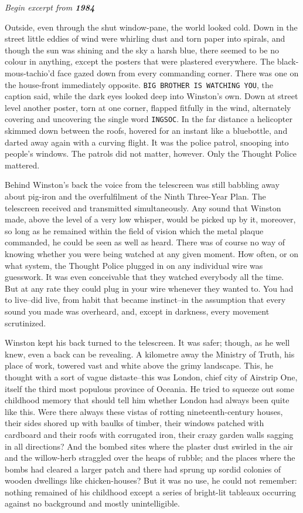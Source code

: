 \emph{Begin excerpt from \textbf{1984}}

Outside, even through the shut window-pane, the world looked cold. Down
in the street little eddies of wind were whirling dust and torn paper
into spirals, and though the sun was shining and the sky a harsh blue,
there seemed to be no colour in anything, except the posters that were
plastered everywhere. The black-mous-tachio'd face gazed down from every
commanding corner. There was one on the house-front immediately
opposite. \texttt{BIG\ BROTHER\ IS\ WATCHING\ YOU}, the caption said,
while the dark eyes looked deep into Winston's own. Down at street level
another poster, torn at one corner, flapped fitfully in the wind,
alternately covering and uncovering the single word \texttt{INGSOC}. In
the far distance a helicopter skimmed down between the roofs, hovered
for an instant like a bluebottle, and darted away again with a curving
flight. It was the police patrol, snooping into people's windows. The
patrols did not matter, however. Only the Thought Police mattered.

Behind Winston's back the voice from the telescreen was still babbling
away about pig-iron and the overfulfilment of the Ninth Three-Year Plan.
The telescreen received and transmitted simultaneously. Any sound that
Winston made, above the level of a very low whisper, would be picked up
by it, moreover, so long as he remained within the field of vision which
the metal plaque commanded, he could be seen as well as heard. There was
of course no way of knowing whether you were being watched at any given
moment. How often, or on what system, the Thought Police plugged in on
any individual wire was guesswork. It was even conceivable that they
watched everybody all the time. But at any rate they could plug in your
wire whenever they wanted to. You had to live--did live, from habit that
became instinct--in the assumption that every sound you made was
overheard, and, except in darkness, every movement scrutinized.

Winston kept his back turned to the telescreen. It was safer; though, as
he well knew, even a back can be revealing. A kilometre away the
Ministry of Truth, his place of work, towered vast and white above the
grimy landscape. This, he thought with a sort of vague distaste--this
was London, chief city of Airstrip One, itself the third most populous
province of Oceania. He tried to squeeze out some childhood memory that
should tell him whether London had always been quite like this. Were
there always these vistas of rotting nineteenth-century houses, their
sides shored up with baulks of timber, their windows patched with
cardboard and their roofs with corrugated iron, their crazy garden walls
sagging in all directions? And the bombed sites where the plaster dust
swirled in the air and the willow-herb straggled over the heaps of
rubble; and the places where the bombs had cleared a larger patch and
there had sprung up sordid colonies of wooden dwellings like
chicken-houses? But it was no use, he could not remember: nothing
remained of his childhood except a series of bright-lit tableaux
occurring against no background and mostly unintelligible.

